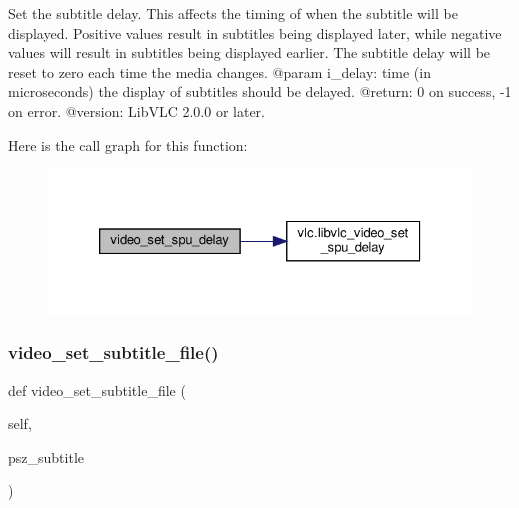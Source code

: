 \begin{DoxyVerb}Set the subtitle delay. This affects the timing of when the subtitle will
be displayed. Positive values result in subtitles being displayed later,
while negative values will result in subtitles being displayed earlier.
The subtitle delay will be reset to zero each time the media changes.
@param i_delay: time (in microseconds) the display of subtitles should be delayed.
@return: 0 on success, -1 on error.
@version: LibVLC 2.0.0 or later.
\end{DoxyVerb}
 Here is the call graph for this function\+:
\nopagebreak
\begin{figure}[H]
\begin{center}
\leavevmode
\includegraphics[width=326pt]{classvlc_1_1_media_player_ae4fb19229a13d2a7b6a16b37d083244b_cgraph}
\end{center}
\end{figure}
\mbox{\label{classvlc_1_1_media_player_ae40ff9e2747b2ae1910f3c302776b242}} 
\subsubsection{\texorpdfstring{video\+\_\+set\+\_\+subtitle\+\_\+file()}{video\_set\_subtitle\_file()}}
{\footnotesize\ttfamily def video\+\_\+set\+\_\+subtitle\+\_\+file (\begin{DoxyParamCaption}\item[{}]{self,  }\item[{}]{psz\+\_\+subtitle }\end{DoxyParamCaption})}

